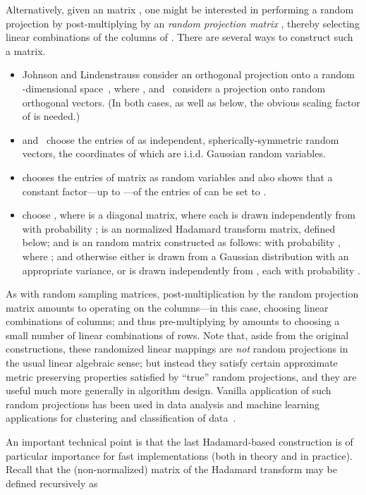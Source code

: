 \documentclass[twoside]{article}
\begin{document}
Alternatively, given an  matrix , one might be interested in 
performing a random projection by post-multiplying  by an 
 \emph{random projection matrix} , thereby selecting 
 linear combinations of the columns of .
There are several ways to construct such a matrix.
\begin{itemize}
\item
Johnson and Lindenstrauss consider an orthogonal projection onto a random 
-dimensional space~\cite{JL84}, where , 
and~\cite{FH87} considers a projection onto  random orthogonal vectors.
(In both cases, as well as below, the obvious scaling factor of 
 is needed.)
\item
\cite{IM98} and~\cite{DG02} 
choose
the entries of  as independent, 
spherically-symmetric random vectors, the coordinates of which are  
i.i.d. Gaussian  random variables. 
\item
\cite{Ach03_JRNL} 
chooses
the entries of  matrix  as  random 
variables and also shows that a constant factor---up to ---of the 
entries of  can be set to .
\item
\cite{AC06,AC06-JRNL09,Matousek08_RSA} choose , where  
is a  diagonal matrix, where each  is drawn 
independently from  with probability ;  is an 
 normalized Hadamard transform matrix, defined below; and 
 is an  random matrix constructed as follows:
 with probability , where ;
and otherwise either  is drawn from a Gaussian distribution with 
an appropriate variance, or  is drawn independently from 
, each with probability .
\end{itemize}
As with random sampling matrices, post-multiplication by the  
random projection matrix  amounts to operating on the columns---in 
this case, choosing linear combinations of columns; and thus pre-multiplying 
by  amounts to choosing a small number of linear combinations of 
rows.
Note that, aside from the original constructions, these randomized linear 
mappings are \emph{not} random projections in the usual linear algebraic 
sense; but instead they satisfy certain approximate metric preserving 
properties satisfied by ``true'' random projections, and they are useful 
much more generally in algorithm design.
Vanilla application of such random projections has been used in data 
analysis and machine learning applications for clustering and classification 
of data~\cite{Kas98,BM01,FM03,FB03,GBN05,VW11}.

An important technical point is that the last Hadamard-based construction
is of particular importance for fast implementations (both in theory and in 
practice).  
Recall that the (non-normalized)  matrix of the Hadamard 
transform  may be defined recursively as 
\end{document}
